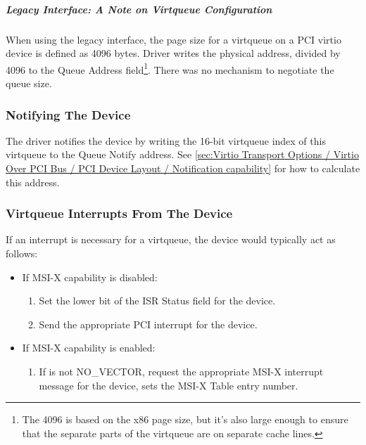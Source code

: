 \subparagraph{Legacy Interface: A Note on Virtqueue Configuration}\label{sec:Virtio Transport Options / Virtio Over PCI Bus / PCI-specific Initialization And Device Operation / Device Initialization / Virtqueue Configuration / Legacy Interface: A Note on Virtqueue Configuration}
When using the legacy interface, the page size for a virtqueue on a PCI virtio
device is defined as 4096 bytes.  Driver writes the physical address, divided
by 4096 to the Queue Address field\footnote{The 4096 is based on the x86 page size, but it's also large
enough to ensure that the separate parts of the virtqueue are on
separate cache lines.
}.  There was no mechanism to negotiate the queue size.

\subsubsection{Notifying The Device}\label{sec:Virtio Transport Options / Virtio Over PCI Bus / PCI-specific Initialization And Device Operation / Notifying The Device}

The driver notifies the device by writing the 16-bit virtqueue index
of this virtqueue to the Queue Notify address.  See \ref{sec:Virtio Transport Options / Virtio Over PCI Bus / PCI Device Layout / Notification capability} for how to calculate this address.

\subsubsection{Virtqueue Interrupts From The Device}\label{sec:Virtio Transport Options / Virtio Over PCI Bus / PCI-specific Initialization And Device Operation / Virtqueue Interrupts From The Device}

If an interrupt is necessary for a virtqueue, the device would typically act as follows:

\begin{itemize}
  \item If MSI-X capability is disabled:
    \begin{enumerate}
    \item Set the lower bit of the ISR Status field for the device.

    \item Send the appropriate PCI interrupt for the device.
    \end{enumerate}

  \item If MSI-X capability is enabled:
    \begin{enumerate}
    \item If  is not NO_VECTOR,
      request the appropriate MSI-X interrupt message for the
      device,  sets the MSI-X Table entry
      number.
    \end{enumerate}
\end{itemize}

